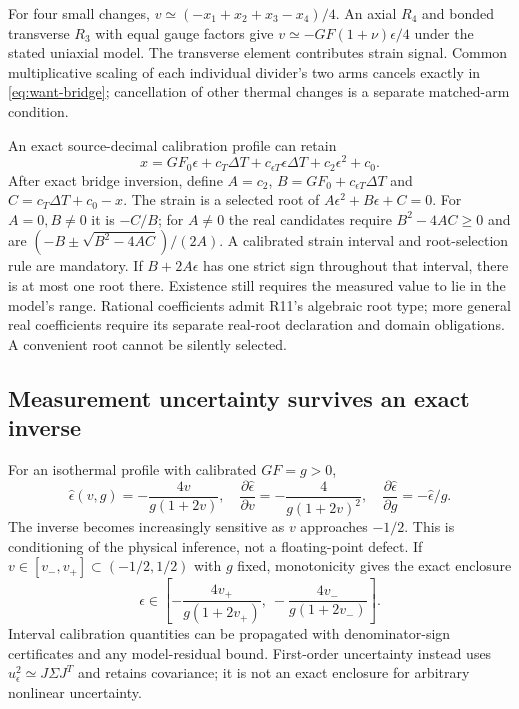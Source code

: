 For four small changes, $v\simeq(-x_1+x_2+x_3-x_4)/4$.
An axial $R_4$ and bonded transverse $R_3$ with equal gauge factors give
$v\simeq-GF(1+\nu)\epsilon/4$ under the stated uniaxial model. The
transverse element contributes strain signal. Common multiplicative scaling
of each individual divider's two arms cancels exactly in
\eqref{eq:want-bridge}; cancellation of other thermal changes is a separate
matched-arm condition.

An exact source-decimal calibration profile can retain
\begin{equation}
 x=GF_0\epsilon+c_T\Delta T+c_{\epsilon T}\epsilon\Delta T
            +c_2\epsilon^2+c_0 .
\end{equation}
After exact bridge inversion, define $A=c_2$,
$B=GF_0+c_{\epsilon T}\Delta T$ and $C=c_T\Delta T+c_0-x$.
The strain is a selected root of $A\epsilon^2+B\epsilon+C=0$.
For $A=0,B\ne0$ it is $-C/B$; for $A\ne0$ the real candidates require
$B^2-4AC\ge0$ and are $(-B\pm\sqrt{B^2-4AC})/(2A)$.
A calibrated strain interval and root-selection rule are mandatory. If
$B+2A\epsilon$ has one strict sign throughout that interval, there is at
most one root there. Existence still requires the measured value to lie in
the model's range. Rational coefficients admit R11's algebraic root type;
more general real coefficients require its separate real-root declaration
and domain obligations. A convenient root cannot be silently selected.

\subsection{Measurement uncertainty survives an exact inverse}
For an isothermal profile with calibrated $GF=g>0$,
\begin{equation}
 \widehat\epsilon(v,g)=-\frac{4v}{g(1+2v)},\quad
 \frac{\partial\widehat\epsilon}{\partial v}
    =-\frac4{g(1+2v)^2},\quad
 \frac{\partial\widehat\epsilon}{\partial g}=-\widehat\epsilon/g .
\end{equation}
The inverse becomes increasingly sensitive as $v$ approaches $-1/2$.
This is conditioning of the physical inference, not a floating-point defect.
If $v\in[v_-,v_+]\subset(-1/2,1/2)$ with $g$ fixed, monotonicity gives
the exact enclosure
\begin{equation}
 \epsilon\in\left[
  -\frac{4v_+}{g(1+2v_+)},\ -\frac{4v_-}{g(1+2v_-)}\right].
 \label{eq:want-strain-enclosure}
\end{equation}
Interval calibration quantities can be propagated with denominator-sign
certificates and any model-residual bound. First-order uncertainty instead
uses $u_\epsilon^2\simeq J\Sigma J^T$ and retains covariance; it is not an
exact enclosure for arbitrary nonlinear uncertainty.


